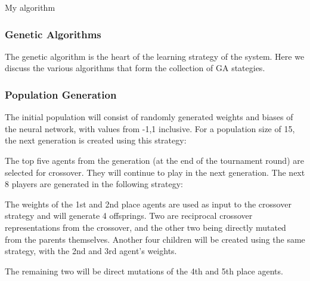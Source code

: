 \documentclass[12pt,a4paper]{article}
\makeatletter
\def\BState{\State\hskip-\ALG@thistlm}
\makeatother
\begin{document}
\begin{algorithm}
    \caption{My algorithm}
\end{algorithm}

\cite{budgen}

\subsubsection{Genetic Algorithms}

The genetic algorithm is the heart of the learning strategy of the system. Here we discuss the various algorithms that form the collection of GA stategies.

\subsubsection{Population Generation}

The initial population will consist of randomly generated weights and biases of the neural network, with values from -1,1 inclusive. For a population size of 15, the next generation is created using this strategy:

The top five agents from the generation (at the end of the tournament round) are selected for crossover. They will continue to play in the next generation.
The next 8 players are generated in the following strategy:

The weights of the 1st and 2nd place agents are used as input to the crossover strategy and will generate 4 offsprings. Two are reciprocal crossover representations from the crossover, and the other two being directly mutated from the parents themselves. Another four children will be created using the same strategy, with the 2nd and 3rd agent's weights. 

The remaining two will be direct mutations of the 4th and 5th place agents.
\end{document}
